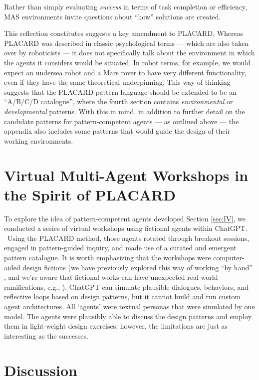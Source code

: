 \documentclass[acmlarge,timestamp]{acmart}
\begin{document}
Rather than simply evaluating \emph{success} in terms of task
completion or efficiency, MAS environments invite questions about
“how” solutions are created.

This reflection constitutes suggests a key amendment to PLACARD.
Whereas PLACARD was described in classic psychological terms
\cite{Hilgard1980} — which are also taken over by roboticists
\cite{cassimatis2004integrating} — it does not specifically talk about
the environment in which the agents it considers would be situated.
In robot terms, for example, we would expect an undersea robot and a
Mars rover to have very different functionality, even if they have the
same theoretical underpinning.  This way of thinking suggests that the
PLACARD pattern language should be extended to be an “A/B/C/D
catalogue”, where the fourth section contains \emph{environmental} or
\emph{developmental} patterns.  With this in mind, in addition to
further detail on the candidate patterns for pattern-competent agents
— as outlined above — the appendix also includes some patterns that
would guide the design of their working environments.  

\section{Virtual Multi-Agent Workshops in the Spirit of PLACARD}\label{sec:V}

To explore the idea of pattern-competent agents developed Section
\ref{sec:IV}, we conducted a series of virtual workshops using
fictional agents within ChatGPT. ~Using the PLACARD method, those
agents rotated through breakout sessions, engaged in pattern-guided
inquiry, and made use of a curated and emergent pattern catalogue.  It
is worth emphasizing that the workshops were computer-aided design
fictions (we have previously explored this way of working “by hand”
\cite{fictional-peeragogical}, and we’re aware that fictional works
can have unexpected real-world ramifications, e.g.,
\cite{enwiki:1290575156}).  ChatGPT can simulate plausible dialogues,
behaviors, and reflective loops based on design patterns, but it
cannot build and run custom agent architectures.  All `agents' were
textual personas that were simulated by one model.  The agents were
plausibly able to discuss the design patterns and employ them in
light-weight design exercises; however, the limitations are just as
interesting as the successes.

\section{Discussion}\label{sec:discussion}
\end{document}
